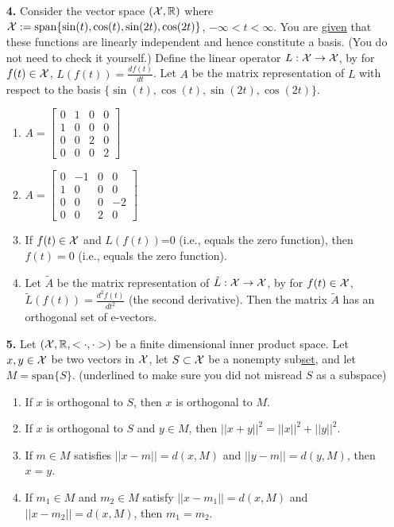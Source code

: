\documentclass[letterpaper]{article}
\newcommand{\real}{\mathbb R}  %
\newcommand{\spanof}[1]{\textrm{span} \{ #1 \}}
\begin{document}
\begin{enumerate}
\item[{\bf 4.}]  Consider the vector space $({\cal X}, \real)$ where ${\cal X}:=\spanof{\sin(t), \cos(t), \sin(2t), \cos(2t)}$, $-\infty < t < \infty$. You are \underline{given} that these functions are linearly independent and hence constitute a basis. (You do not need to check it yourself.) Define the linear operator $L: {\cal X} \to {\cal X}$, by for $f(t) \in {\cal X}$, $L(f(t)) = \frac{df(t)}{dt}$. Let $A$ be the matrix representation of $L$ with respect to the basis $\{\sin(t), \cos(t), \sin(2t), \cos(2t)\}.$
\begin{enumerate}
\setlength{\itemsep}{.15in}
\renewcommand{\labelenumi}{(\alph{enumi})}
\setlength{\itemsep}{.1in}
\item $A= \left[ \begin{array}{rrrr}  0 & 1 & 0 & 0\\ 1 & 0 & 0 & 0\\ 0 & 0 & 2 & 0\\ 0 & 0 & 0& 2\end{array}  \right]$
\item $A= \left[ \begin{array}{rrrr}  0 & -1 & 0 & 0\\ 1 & 0 & 0 & 0\\ 0 & 0 & 0& -2\\ 0 & 0 & 2& 0\end{array}  \right]$
\item  If $f(t) \in {\cal X}$ and $L(f(t))$=0 (i.e., equals the zero function), then $f(t)=0$ (i.e., equals the zero function).
\item  Let $\tilde{A}$ be the matrix representation of $\tilde{L}: {\cal X} \to {\cal X}$, by for $f(t) \in {\cal X}$, $\tilde{L}(f(t)) = \frac{d^2f(t)}{dt^2}$ (the second derivative). Then the matrix $\tilde{A}$ has an orthogonal set of e-vectors.
\end{enumerate}

\newpage


\item[{\bf 5.}] Let $({\cal X}, \real, <\cdot, \cdot>)$ be a finite dimensional inner product space. Let $x, y \in {\cal X}$ be two vectors in ${\cal X}$, let $S\subset {\cal X}$ be a nonempty sub\underline{set}, and let $M = \spanof{S}$. (underlined to make sure you did not misread $S$ as a subspace)
\begin{enumerate}
\setlength{\itemsep}{.15in}
\renewcommand{\labelenumi}{(\alph{enumi})}
\setlength{\itemsep}{.1in}
\item If $x$ is orthogonal to ${S}$, then $x$ is orthogonal to $M$.
\item If $x$ is orthogonal to $S$ and $y\in M$, then $||x+y||^2=||x||^2 + ||y||^2$.
\item If $m \in M$ satisfies $||x-m|| = d(x,M)$ and $||y-m|| = d(y,M)$, then $x=y$.
\item If $m_1\in M$ and $m_2\in M$ satisfy $||x-m_1|| = d(x,M)$ and $||x-m_2|| = d(x,M)$, then $m_1=m_2$.
\end{enumerate}


\end{enumerate}
\end{document}
